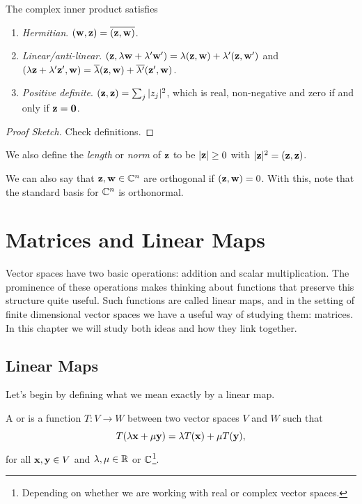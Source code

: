 \documentclass[a4paper]{scrartcl}
\begin{document}
\begin{proposition}
    The complex inner product satisfies
    \begin{enumerate}[label=(\roman*)]
        \item \emph{Hermitian}. $(\mathbf{w}, \mathbf{z}) = \overline{(\mathbf{z}, \mathbf{w})}$.
        \item \emph{Linear/anti-linear}. $(\mathbf{z}, \lambda \mathbf{w}+ \lambda' \mathbf{w}') = \lambda(\mathbf{z}, \mathbf{w}) + \lambda' (\mathbf{z}, \mathbf{w}')$ and $(\lambda \mathbf{z} + \lambda' \mathbf{z}', \mathbf{w}) = \overline{\lambda}(\mathbf{z}, \mathbf{w}) + \overline{\lambda'} (\mathbf{z}' , \mathbf{w})$.
        \item \emph{Positive definite}. $(\mathbf{z}, \mathbf{z}) = \sum_j |z_j|^2$, which is real, non-negative and zero if and only if $\mathbf{z} = \mathbf{0}$.
    \end{enumerate}
\end{proposition}
\begin{proof}[Proof Sketch]
    Check definitions.
\end{proof}

We also define the \emph{length} or \emph{norm} of $\mathbf{z}$ to be $|\mathbf{z}| \geq 0$ with $|\mathbf{z}|^2 = (\mathbf{z}, \mathbf{z})$.

We can also say that $\mathbf{z}, \mathbf{w} \in \mathbb{C}^n$ are orthogonal if $(\mathbf{z}, \mathbf{w}) = 0$. With this, note that the standard basis for $\mathbb{C}^n$ is orthonormal.

\section{Matrices and Linear Maps}

Vector spaces have two basic operations: addition and scalar multiplication. 
The prominence of these operations makes thinking about functions that preserve this structure quite useful. Such functions are called linear maps, and in the setting of finite dimensional vector spaces we have a useful way of studying them: matrices. In this chapter we will study both ideas and how they link together.

\subsection{Linear Maps}

Let's begin by defining what we mean exactly by a linear map.

\begin{definition}
    A  or  is a function $T : V \rightarrow W$ between two vector spaces $V$ and $W$ such that
    $$
    T(\lambda \mathbf{x} + \mu \mathbf{y}) = \lambda T(\mathbf{x}) + \mu T(\mathbf{y}),
    $$
    for all $\mathbf{x}, \mathbf{y} \in V$ and $\lambda, \mu \in \mathbb{R}$ or $\mathbb{C}$\footnote{Depending on whether we are working with real or complex vector spaces.}.
\end{definition}
\end{document}
